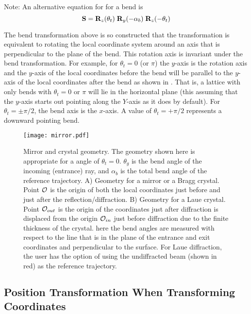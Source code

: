 Note: An alternative equation for \vn{\bfS} for a bend is
 \begin{equation}
  {\bf S} = {\bf R}_{z}(\theta_t) \; {\bf R}_{y}(-\alpha_b) \; {\bf R}_{z}(-\theta_t)
  \label{srrr}
\end{equation}

The bend transformation above is so constructed that the transformation is equivalent to rotating
the local coordinate system around an axis that is perpendicular to the plane of the bend. This
rotation axis is invariant under the bend transformation. For example, for $\theta_t = 0$ (or $\pi$)
the $y$-axis is the rotation axis and the $y$-axis of the local coordinates before the bend will be
parallel to the $y$-axis of the local coordinates after the bend as shown in . That
is, a lattice with only bends with $\theta_t = 0$ or $\pi$ will lie in the horizontal plane (this
assuming that the $y$-axis starts out pointing along the $Y$-axis as it does by default).  For
$\theta_t = \pm\pi/2$, the bend axis is the $x$-axis. A value of $\theta_t = +\pi/2$ represents a
downward pointing bend.

\begin{figure}
  \centering \texttt{[image: mirror.pdf]} 
\caption[Mirror and crystal geometry] {Mirror and crystal geometry.  The geometry shown here is
appropriate for a  angle of $\theta_t = 0$.  $\theta_g$ is the bend angle of the
incoming (entrance) ray, and $\alpha_b$ is the total bend angle of the reference trajectory. A)
Geometry for a mirror or a Bragg crystal. Point ${\cal O}$ is the origin of both the local coordinates
just before and just after the reflection/diffraction. B) Geometry for a Laue crystal.  Point
${\cal O}_{out}$ is the origin of the coordinates just after diffraction is displaced from the origin
${\cal O}_{in}$ just before diffraction due to the finite thickness of the crystal. here the bend
angles are measured with respect to the line that is in the plane of the entrance and exit
coordinates and perpendicular to the surface. For Laue diffraction, the user has the option of using
the undiffracted beam (shown in red) as the reference trajectory.
  }  
  \label{f:mirror}
\end{figure}

\subsection{Position Transformation When Transforming Coordinates}
\label{s:pos.trans}

